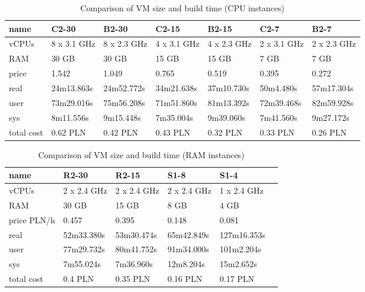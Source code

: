\documentclass[printmode]{mgr}
\begin{document}
\begin{landscape}

\begin{table}
  \begin{tabular}{| p{2.5cm} | p{3cm} | p{3cm} | p{3cm} | p{3cm} | p{3cm} | p{3cm} |}
    \hline
    name & C2-30 & B2-30 & C2-15 & B2-15 & C2-7 & B2-7 \\
    \hline
    vCPUs & 8 x 3.1 GHz & 8 x 2.3 GHz & 4 x 3.1 GHz & 4 x 2.3 GHz & 2 x 3.1 GHz & 2 x 2.3 GHz \\
    \hline
    RAM & 30 GB & 30 GB & 15 GB & 15 GB & 7 GB & 7 GB \\
    \hline
    price & 1.542 & 1.049 & 0.765 & 0.519 & 0.395 & 0.272 \\
    \hline
    real & 24m13.863s & 24m52.772s & 34m21.638s & 37m10.730s & 50m4.480s & 57m17.304s \\
    \hline
    user & 73m29.016s & 75m56.208s & 71m51.860s & 81m13.392s & 72m39.468s & 82m59.928s \\
    \hline
    sys & 8m11.556s & 9m15.448s & 7m35.004s & 9m39.060s & 7m41.560s & 9m27.172s \\
    \hline
    total cost & 0.62 PLN & 0.42 PLN & 0.43 PLN & 0.32 PLN & 0.33 PLN & 0.26 PLN \\
    \hline
  \end{tabular}
  \caption{Comparison of VM size and build time (CPU instances)}
\end{table}



\begin{table}
  \begin{tabular}{| p{2.5cm} | p{3cm} | p{3cm} | p{3cm} | p{3cm} | p{3cm} |}
    \hline
    name & R2-30 & R2-15 & S1-8 & S1-4 \\
    \hline
    vCPUs & 2 x 2.4 GHz & 2 x 2.4 GHz & 2 x 2.4 GHz & 1 x 2.4 GHz \\
    \hline
    RAM & 30 GB & 15 GB & 8 GB & 4 GB \\
    \hline
    price PLN/h& 0.457 & 0.395 & 0.148 & 0.081 \\
    \hline
    real & 52m33.380s & 53m30.474s & 65m42.849s & 127m16.353s \\
    \hline
    user & 77m29.732s & 80m41.752s & 91m34.000s & 101m2.204s \\
    \hline
    sys & 7m55.024s & 7m36.960s & 12m8.204s & 15m2.652s \\
    \hline
    total cost & 0.4 PLN & 0.35 PLN & 0.16 PLN & 0.17 PLN \\
    \hline
  \end{tabular}
  \caption{Comparison of VM size and build time (RAM instances)}
\end{table}

\end{landscape}
\end{document}
